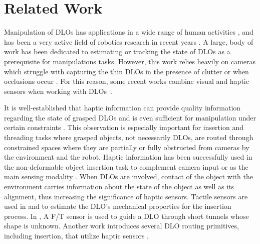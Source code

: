 \section{Related Work}
\label{sec:related}



Manipulation of DLOs has applications in a wide range of human activities \cite{zhu_challenges_2021}, and has been a very active field of robotics  research in recent years \cite{sanchez_robotic_2018,caporali2026robotic}. A large,  body of work has been dedicated to estimating \cite{10167643,11248900,11568531} or tracking \cite{9928322,dinkel_dlo-splatting_2025,caporali2025robotic} the state of DLOs as a prerequisite for manipulations tasks. However, this work relies heavily on cameras which struggle with capturing the thin DLOs in the presence of clutter or when occlusions occur \cite{cop2021new}. For this reason, some recent works combine visual and haptic sensors when working with DLOs~\cite{nadon_multi-modal_2018,pecyna_visual-tactile_2022,11246285,11482717,caporali2026vision}. 

It is well-established that haptic information can provide quality information regarding the state of grasped DLOs \cite{bretl2014quasistatic,ms-lcwrtsemp-23,monguzzi2024force} and is even sufficient for manipulation under certain constraints \cite{smbb-mpdamer-20,slk-ftmdloeffi-22}. This observation is especially important for insertion and threading tasks where grasped objects, not necessarily DLOs, are routed through constrained spaces where they are partially or fully obstructed from cameras by the environment and the robot. Haptic information has been successfully used in the non-deformable object insertion task to complement camera input \cite{caporali2026vision} or as the main sensing modality \cite{kamijo2026tactile}. When DLOs are involved, contact of the object with the environment carries information about the state of the object as well as its alignment, thus increasing the significance of haptic sensors. Tactile sensors are used in \cite{de2018integration} and \cite{zanella2019dlo} to estimate the DLO's mechanical properties for the insertion process. In \cite{lvw-crcrisb-24}, A F/T sensor is used to guide a DLO through short tunnels whose shape is unknown. Another work introduces several DLO routing primitives, including insertion, that utilize haptic sensors \cite{wjly-cratmp-22}.   


